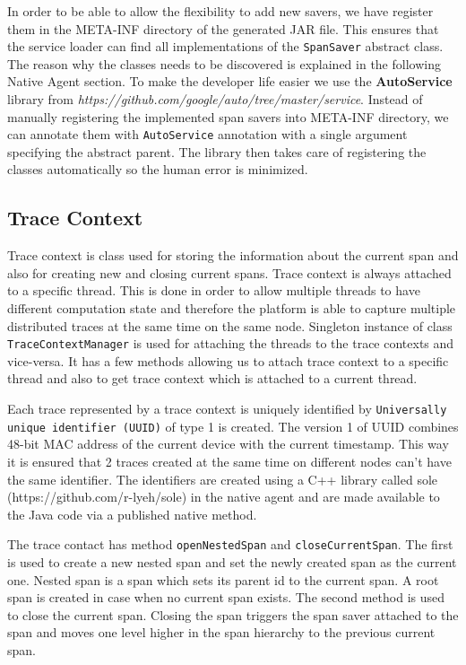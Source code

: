 In order to be able to allow the flexibility to add new savers, we have register them in the META-INF directory of the generated JAR file. This ensures that the service loader can find all implementations of the \texttt{SpanSaver} abstract class. The reason why the classes needs to be discovered is explained in the following Native Agent section. To make the developer life easier we use the \textbf{AutoService}  library from \textit{https://github.com/google/auto/tree/master/service}. Instead of manually registering the implemented span savers into META-INF directory, we can annotate them with \texttt{AutoService} annotation with a single argument specifying the abstract parent. The library then takes care of registering the classes automatically so the human error is minimized.

\subsection{Trace Context}
Trace context is class used for storing the information about the current span and also for creating new and closing current spans. Trace context is always attached to a specific thread. This is done in order to allow multiple threads to have different computation state and therefore the platform is able to capture multiple distributed traces at the same time on the same node. Singleton instance of class \texttt{TraceContextManager} is used for attaching the threads to the trace contexts and vice-versa. It has a few methods allowing us to attach trace context to a specific thread and also to get trace context which is attached to a current thread.

Each trace represented by a trace context is uniquely identified by \texttt{Universally unique identifier (UUID)} of type 1 is created. The version 1 of UUID combines 48-bit MAC address of the current device with the current timestamp. This way it is ensured that 2 traces created at the same time on different nodes can't have the same identifier. The identifiers are created using a C++ library called sole (https://github.com/r-lyeh/sole) in the native agent and are made available to the Java code via a published native method.

The trace contact has method \texttt{openNestedSpan} and \texttt{closeCurrentSpan}. The first is used to create a new nested span and set the newly created span as the current one. Nested span is a span which sets its parent id to the current span. A root span is created in case when no current span exists. The second method is used to close the current span. Closing the span triggers the span saver attached to the span and moves one level higher in the span hierarchy to the previous current span.

